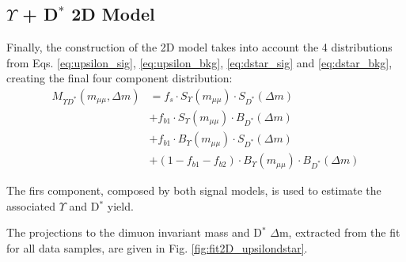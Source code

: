 \subsection{\texorpdfstring{$\Upsilon$ + D$^{*}$}{Y+D*} 2D Model}

Finally, the construction of the 2D model takes into account the 4 distributions from Eqs. \ref{eq:upsilon_sig}, \ref{eq:upsilon_bkg}, \ref{eq:dstar_sig} and \ref{eq:dstar_bkg}, creating the final four component distribution:
\begin{equation}
  \begin{split}
    M_{\Upsilon D^*}(m_{\mu\mu}, \Delta m) & = f_s \cdot S_\Upsilon(m_{\mu\mu}) \cdot S_{D^*}(\Delta m) \\
    & + f_{b1} \cdot S_\Upsilon(m_{\mu\mu}) \cdot B_{D^*}(\Delta m) \\
    & + f_{b1} \cdot B_\Upsilon(m_{\mu\mu}) \cdot S_{D^*}(\Delta m) \\
    & + (1-f_{b1}-f_{b2}) \cdot B_\Upsilon(m_{\mu\mu}) \cdot B_{D^*}(\Delta m)
  \end{split}
\end{equation}

The firs component, composed by both signal models, is used to estimate the associated $\Upsilon$ and D$^*$ yield.

The projections to the dimuon invariant mass and D$^*$ $\Delta$m, extracted from the fit for all data samples, are given in Fig. \ref{fig:fit2D_upsilondstar}.


